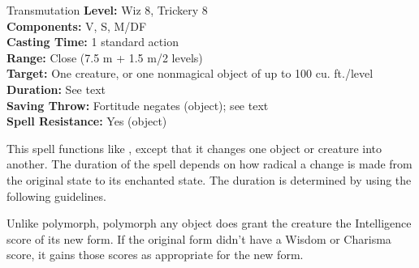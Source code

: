 {Transmutation}
{
	\textbf{Level:}
	Wiz 8, Trickery 8\\
	\textbf{Components:}
	V, S, M/DF\\
	\textbf{Casting Time:}
	1 standard action\\
	\textbf{Range:}
	Close (7.5 m + 1.5 m/2 levels)\\
	\textbf{Target:}
	One creature, or one nonmagical object of up to 100 cu. ft./level\\
	\textbf{Duration:}
	See text\\
	\textbf{Saving Throw:}
	Fortitude negates (object); see text\\
	\textbf{Spell Resistance:}
	Yes (object)\\
}
{
	This spell functions like , except that it changes one object or creature into another. The duration of the spell depends on how radical a change is made from the original state to its enchanted state. The duration is determined by using the following guidelines.



	Unlike polymorph, polymorph any object does grant the creature the Intelligence score of its new form. If the original form didn't have a Wisdom or Charisma score, it gains those scores as appropriate for the new form.

}
